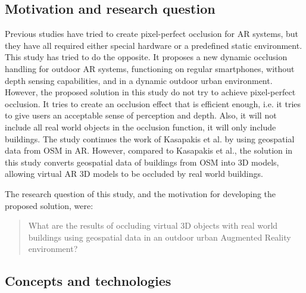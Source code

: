\subsection{Motivation and research question}
Previous studies have tried to create pixel-perfect occlusion for AR systems, but they have all required either special hardware or a predefined static environment. This study has tried to do the opposite. It proposes a new dynamic occlusion handling for outdoor AR systems, functioning on regular smartphones, without depth sensing capabilities, and in a dynamic outdoor urban environment. However, the proposed solution in this study do not try to achieve pixel-perfect occlusion. It tries to create an occlusion effect that is efficient enough, i.e. it tries to give users an acceptable sense of perception and depth. Also, it will not include all real world objects in the occlusion function, it will only include buildings. The study continues the work of Kasapakis et al. \cite{kasapakis2015determining} by using geospatial data from OSM in AR. However, compared to Kasapakis et al., the solution in this study converts geospatial data of buildings from OSM into 3D models, allowing virtual AR 3D models to be occluded by real world buildings.  

The research question of this study, and the motivation for developing the proposed solution, were:
\begin{quote}
What are the results of occluding virtual 3D objects with real world buildings using geospatial data in an outdoor urban Augmented Reality environment?
\end{quote}

\subsection{Concepts and technologies}
